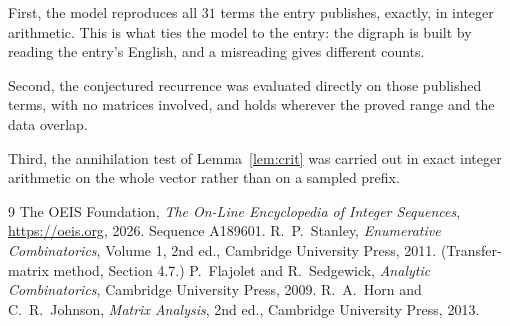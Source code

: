 \documentclass[11pt,a4paper]{article}
\theoremstyle{plain}
\theoremstyle{definition}
\begin{document}
First, the model reproduces all $31$ terms the entry publishes, exactly, in integer
arithmetic. This is what ties the model to the entry: the digraph is built by reading the
entry's English, and a misreading gives different counts.

Second, the conjectured recurrence was evaluated directly on those published terms, with no
matrices involved, and holds wherever the proved range and the data overlap.

Third, the annihilation test of Lemma~\ref{lem:crit} was carried out in exact integer
arithmetic on the whole vector rather than on a sampled prefix.

\begin{thebibliography}{9}
 The OEIS Foundation, \emph{The On-Line Encyclopedia of Integer
Sequences}, \url{https://oeis.org}, 2026. Sequence A189601.
 R.~P.~Stanley, \emph{Enumerative Combinatorics}, Volume 1, 2nd ed.,
Cambridge University Press, 2011. (Transfer-matrix method, Section 4.7.)
 P.~Flajolet and R.~Sedgewick, \emph{Analytic Combinatorics}, Cambridge
University Press, 2009.
 R.~A.~Horn and C.~R.~Johnson, \emph{Matrix Analysis}, 2nd ed., Cambridge
University Press, 2013.
\end{thebibliography}
\end{document}
